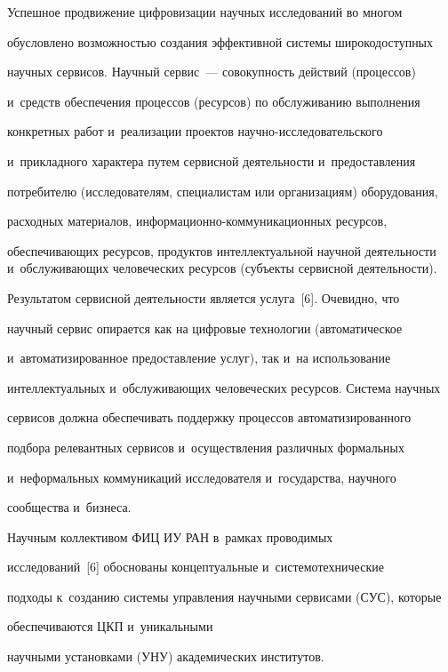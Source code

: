 \vspace*{-2pt}



    Успешное продвижение цифровизации научных исследований во многом 

обусловлено возможностью создания эффективной системы широкодоступных 

научных сервисов. Научный сервис~--- совокупность действий (процессов) 

и~средств обеспечения процессов (ресурсов) по обслуживанию выполнения 

конкретных работ и~реализации проектов научно-исследовательского 

и~прикладного характера путем сервисной деятельности и~предоставления 

потребителю (исследователям, специалистам или организациям) оборудования, 

расходных материалов, ин\-фор\-ма\-ци\-он\-но-ком\-му\-ни\-ка\-ци\-онн\-ых ресурсов, 

обеспечивающих ресурсов, продуктов интеллектуальной научной деятельности и~обслуживающих человеческих ресурсов (субъекты сервисной деятельности). 

Результатом сервисной деятельности является услуга~[6]. Очевидно, что 

научный сервис опирается как на цифровые технологии (автоматическое 

и~автоматизированное предоставление услуг), так и~на использование 

интеллектуальных и~обслуживающих человеческих ресурсов. Система научных 

сервисов должна обеспечивать поддержку процессов автоматизированного 

подбора релевантных сервисов и~осуществления различных формальных 

и~неформальных коммуникаций исследователя и~государства, научного 

сообщества и~бизнеса.

    

     Научным коллективом ФИЦ ИУ РАН в~рамках проводимых 

исследований~[6]  обоснованы концептуальные и~системотехнические

 подходы к~созданию системы управ\-ле\-ния научными сервисами (СУС), которые 

обеспечиваются ЦКП и~уникальными 

научными установками (УНУ) академических институтов.

